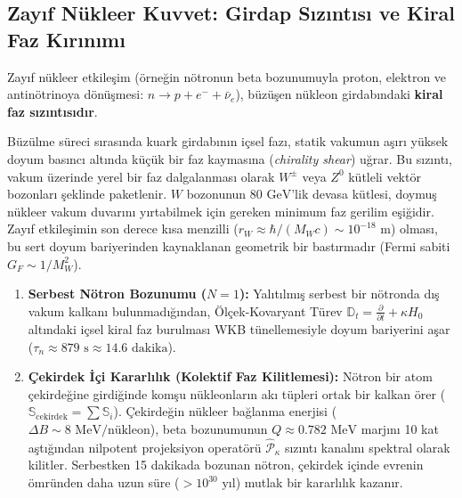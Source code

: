 \subsection{Zayıf Nükleer Kuvvet: Girdap Sızıntısı ve Kiral Faz Kırınımı}
Zayıf nükleer etkileşim (örneğin nötronun beta bozunumuyla proton, elektron ve antinötrinoya dönüşmesi: $n \to p + e^- + \bar{\nu}_e$), büzüşen nükleon girdabındaki \textbf{kiral faz sızıntısıdır}.

Büzülme süreci sırasında kuark girdabının içsel fazı, statik vakumun aşırı yüksek doyum basıncı altında küçük bir faz kaymasına (\textit{chirality shear}) uğrar. Bu sızıntı, vakum üzerinde yerel bir faz dalgalanması olarak $W^\pm$ veya $Z^0$ kütleli vektör bozonları şeklinde paketlenir. $W$ bozonunun $80\text{ GeV}$'lik devasa kütlesi, doymuş nükleer vakum duvarını yırtabilmek için gereken minimum faz gerilim eşiğidir. Zayıf etkileşimin son derece kısa menzilli ($r_W \approx \hbar / (M_W c) \sim 10^{-18}\text{ m}$) olması, bu sert doyum bariyerinden kaynaklanan geometrik bir bastırmadır (Fermi sabiti $G_F \sim 1/M_W^2$).

\begin{enumerate}
    \item \textbf{Serbest Nötron Bozunumu ($N=1$):} Yalıtılmış serbest bir nötronda dış vakum kalkanı bulunmadığından, Ölçek-Kovaryant Türev $\mathbb{D}_t = \frac{\partial}{\partial t} + \kappa H_0$ altındaki içsel kiral faz burulması WKB tünellemesiyle doyum bariyerini aşar ($\tau_n \approx 879\text{ s} \approx 14.6\text{ dakika}$).
    \item \textbf{Çekirdek İçi Kararlılık (Kolektif Faz Kilitlemesi):} Nötron bir atom çekirdeğine girdiğinde komşu nükleonların akı tüpleri ortak bir kalkan örer ($\mathbb{S}_{\mathrm{cekirdek}} = \sum \mathbb{S}_i$). Çekirdeğin nükleer bağlanma enerjisi ($\Delta B \sim 8\text{ MeV/nükleon}$), beta bozunumunun $Q \approx 0.782\text{ MeV}$ marjını 10 kat aştığından nilpotent projeksiyon operatörü $\hat{\mathcal{P}}_\kappa$ sızıntı kanalını spektral olarak kilitler. Serbestken 15 dakikada bozunan nötron, çekirdek içinde evrenin ömründen daha uzun süre ($> 10^{30}\text{ yıl}$) mutlak bir kararlılık kazanır.
\end{enumerate}

